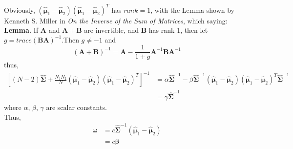 \documentclass[11pt]{article}
\begin{document}
Obviously, $\left(\hat{\pmb{\mu}}_1-\hat{\pmb{\mu}}_2\right)\left(\hat{\pmb{\mu}}_1-\hat{\pmb{\mu}}_2\right)^T$ has $rank = 1$, with the Lemma shown by Kenneth S. Miller in \textit{On the Inverse of the Sum of Matrices}, which saying:
\textbf{Lemma.} If $\pmb{A}$ and $\pmb{A}+\pmb{B}$ are invertible, and $\pmb{B}$ has rank $1$, then let $g=trace(\pmb{BA})^{-1}$.Then $g\ne-1$ and
$$(\pmb{A}+\pmb{B})^{-1}=\pmb{A}-\frac{1}{1+g}\pmb{A}^{-1}\pmb{B}\pmb{A}^{-1}$$
thus,
\begin{equation}
\begin{split}
\left[(N-2)\hat{\pmb{\Sigma}} +\frac{N_1N_2}{N}\left(\hat{\pmb{\mu}}_1-\hat{\pmb{\mu}}_2\right)\left(\hat{\pmb{\mu}}_1-\hat{\pmb{\mu}}_2\right)^T\right]^{-1}&=\alpha\hat{\pmb{\Sigma}}^{-1}-\beta\hat{\pmb{\Sigma}}^{-1}\left(\hat{\pmb{\mu}}_1-\hat{\pmb{\mu}}_2\right)\left(\hat{\pmb{\mu}}_1-\hat{\pmb{\mu}}_2\right)^T\hat{\pmb{\Sigma}}^{-1}\\
&=\gamma\hat{\pmb{\Sigma}}^{-1}
\end{split}
\end{equation}
where $\alpha$, $\beta$, $\gamma$ are scalar constants.\\
Thus, 
\begin{equation}
\begin{split}
\pmb{\omega}&=c\hat{\pmb{\Sigma}}^{-1}\left(\hat{\pmb{\mu}}_1-\hat{\pmb{\mu}}_2\right)\\
&=c\pmb{\beta}
\end{split}
\end{equation}
\end{document}
